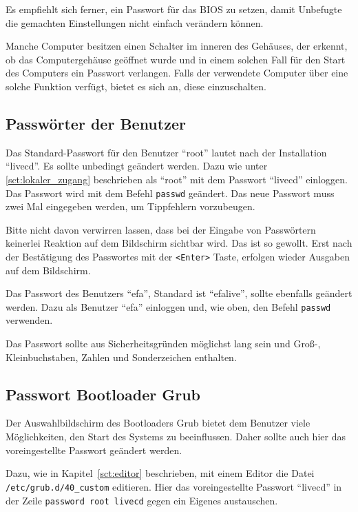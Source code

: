 \documentclass[a4paper,12pt,twoside]{article}
\begin{document}
Es empfiehlt sich ferner, ein Passwort für das BIOS zu setzen, damit
Unbefugte die gemachten Einstellungen nicht einfach verändern können.

Manche Computer besitzen einen Schalter im inneren des Gehäuses, der
erkennt, ob das Computergehäuse geöffnet wurde und in einem solchen
Fall für den Start des Computers ein Passwort verlangen. Falls der
verwendete Computer über eine solche Funktion verfügt, bietet es sich
an, diese einzuschalten.


\subsection{Passwörter der Benutzer}
\label{sct:password_admin}
Das Standard-Passwort für den Benutzer "`root"' lautet nach der Installation
"`livecd"'. Es sollte unbedingt geändert werden. Dazu wie unter \ref{sct:lokaler_zugang} beschrieben als
"`root"' mit dem Passwort "`livecd"' einloggen. Das Passwort wird mit
dem Befehl \texttt{passwd} geändert. Das neue
Passwort muss zwei Mal eingegeben werden, um Tippfehlern vorzubeugen. 

Bitte nicht davon verwirren lassen, dass bei der Eingabe von Passwörtern
keinerlei Reaktion auf dem Bildschirm sichtbar wird. Das ist so
gewollt. Erst nach der Bestätigung des Passwortes mit der
\texttt{{\textless}Enter{\textgreater}} Taste, erfolgen wieder Ausgaben auf dem
Bildschirm.

Das Passwort des Benutzers "`efa"', Standard ist "`efalive"', sollte ebenfalls geändert werden. Dazu 
als Benutzer "`efa"' einloggen und, wie oben, den Befehl \texttt{passwd} verwenden.

Das Passwort sollte aus Sicherheitsgründen möglichst lang sein und
Groß-, Kleinbuchstaben, Zahlen und Sonderzeichen enthalten.


\subsection{Passwort Bootloader Grub}
\label{sct:passwort_grub}
Der Auswahlbildschirm des Bootloaders Grub \cite{GRB1} bietet dem
Benutzer viele Möglichkeiten, den Start des Systems zu beeinflussen.
Daher sollte auch hier das voreingestellte Passwort geändert werden.

Dazu, wie in Kapitel~\ref{sct:editor} beschrieben, mit
einem Editor die Datei \linebreak[4]\texttt{/etc/grub.d/40\_custom} editieren. Hier das
voreingestellte Passwort "`livecd"' in der
Zeile \texttt{password root livecd} gegen ein
Eigenes austauschen.
\end{document}
